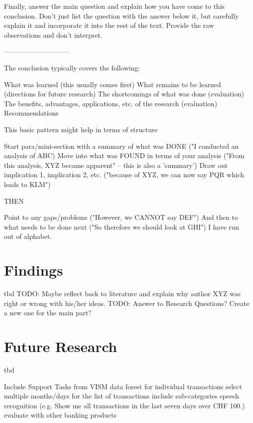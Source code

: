 Finally, answer the main question and explain how you have come to this conclusion. Don’t just list the question with the answer below it, but carefully explain it and incorporate it into the rest of the text. Provide the raw observations and don’t interpret.

-----------------------------


The conclusion typically covers the following:

What was learned (this usually comes first)
What remains to be learned (directions for future research)
The shortcomings of what was done (evaluation)
The benefits, advantages, applications, etc. of the research (evaluation)
Recommendations


This basic pattern might help in terms of structure

Start para/mini-section with a summary of what was DONE ("I conducted an analysis of ABC)
Move into what was FOUND in terms of your analysis ("From this analysis, XYZ became apparent" -- this is also a 'summary')
Draw out implication 1, implication 2, etc. ("because of XYZ, we can now say PQR which leads to KLM")

THEN

Point to any gaps/problems ("However, we CANNOT say DEF")
And then to what needs to be done next ("So therefore we should look at GHI")
I have run out of alphabet.


\section{Findings}

tbd
TODO: Maybe reflect back to literature and explain why author XYZ was right or wrong with his/her ideas.
TODO: Answer to Research Questions? Create a new one for the main part?



\section{Future Research}

tbd


Include Support Tasks from VISM \newline
data forest for individual transactions \newline
select multiple months/days for the list of transactions \newline
include sub-categories \newline
speech recognition (e.g. Show me all transactions in the last seven days over CHF 100.) \newline
evaluate with other banking products  \newline